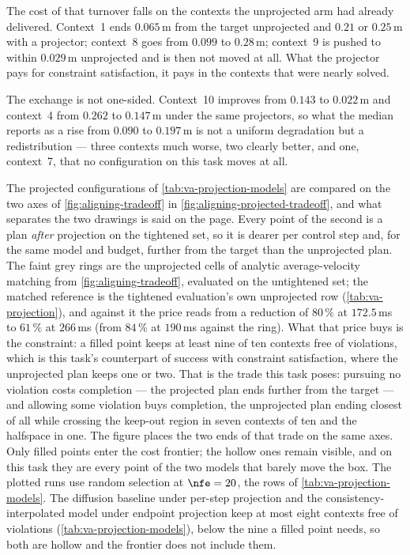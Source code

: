The cost of that turnover falls on the contexts the unprojected arm had already delivered. Context~1 ends
$0.065$\,m from the target unprojected and $0.21$ or $0.25$\,m with a projector; context~8 goes from
$0.099$ to $0.28$\,m; context~9 is pushed to within $0.029$\,m unprojected and is then not moved at all.
What the projector pays for constraint satisfaction, it pays in the contexts that were nearly solved.

The exchange is not one-sided. Context~10 improves from $0.143$ to $0.022$\,m and context~4 from
$0.262$ to $0.147$\,m under the same projectors, so what the median reports as a rise from $0.090$ to
$0.197$\,m is not a uniform degradation but a redistribution --- three contexts much worse, two clearly
better, and one, context~7, that no configuration on this task moves at all.

The projected configurations of \autoref{tab:va-projection-models} are compared on the two axes of
\autoref{fig:aligning-tradeoff} in \autoref{fig:aligning-projected-tradeoff}, and what separates the two
drawings is said on the page. Every point of the second is a plan \emph{after} projection on the tightened
set, so it is dearer per control step and, for the same model and budget, further from the target than
the unprojected plan. The faint grey rings are the unprojected cells of analytic average-velocity matching
from \autoref{fig:aligning-tradeoff}, evaluated on the untightened set; the matched reference is the
tightened evaluation's own unprojected row (\autoref{tab:va-projection}), and against it the price reads
from a reduction of $80\,\%$ at $172.5$\,ms to $61\,\%$ at $266$\,ms (from $84\,\%$ at $190$\,ms against the
ring). What that price buys is the constraint: a filled point keeps at least nine of ten
contexts free of violations, which is this task's counterpart of success with constraint satisfaction,
where the unprojected plan keeps one or two. That is the trade this task poses: pursuing no violation
costs completion --- the projected plan ends further from the target --- and allowing some violation
buys completion, the unprojected plan ending closest of all while crossing the keep-out region in seven
contexts of ten and the halfspace in one. The figure places the two ends of that trade on the same axes. Only filled points enter the cost frontier; the hollow ones
remain visible, and on this task they are every point of the two models that barely move the box. The
plotted runs use random selection at $\nfe=20$, the rows of \autoref{tab:va-projection-models}. The
diffusion baseline under per-step projection and the consistency-interpolated model under endpoint
projection keep at most eight contexts free of violations (\autoref{tab:va-projection-models}), below the
nine a filled point needs, so both are hollow and the frontier does not include them.

